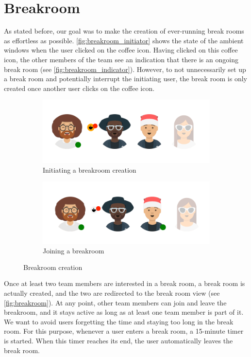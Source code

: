 \section{Breakroom}
As stated before, our goal was to make the creation of ever-running break rooms as effortless as possible. \autoref{fig:breakroom_initiator} shows the state of the ambient windows when the user clicked on the coffee icon. Having clicked on this coffee icon, the other members of the team see an indication that there is an ongoing break room (see \autoref{fig:breakroom_indicator}). However, to not unnecessarily set up a break room and potentially interrupt the initiating user, the break room is only created once another user clicks on the coffee icon.

\begin{figure}[h]
    \centering
    \begin{subfigure}{.5\textwidth}
        \centering
        \includegraphics[width=.8\linewidth]{./images/breakroom_initiator.png}
        \caption{Initiating a breakroom creation }
        \label{fig:breakroom_initiator}
    \end{subfigure}%
    \begin{subfigure}{.5\textwidth}
        \centering
        \includegraphics[width=.8\linewidth]{./images/breakroom_indicator.png}
        \caption{Joining a breakroom }
        \label{fig:breakroom_indicator}
    \end{subfigure}
    \caption{Breakroom creation}
\end{figure}


Once at least two team members are interested in a break room, a break room is actually created, and the two are redirected to the break room view (see \autoref{fig:breakroom}). At any point, other team members can join and leave the breakroom, and it stays active as long as at least one team member is part of it. We want to avoid users forgetting the time and staying too long in the break room. For this purpose, whenever a user enters a break room, a 15-minute timer is started. When this timer reaches its end, the user automatically leaves the break room.

